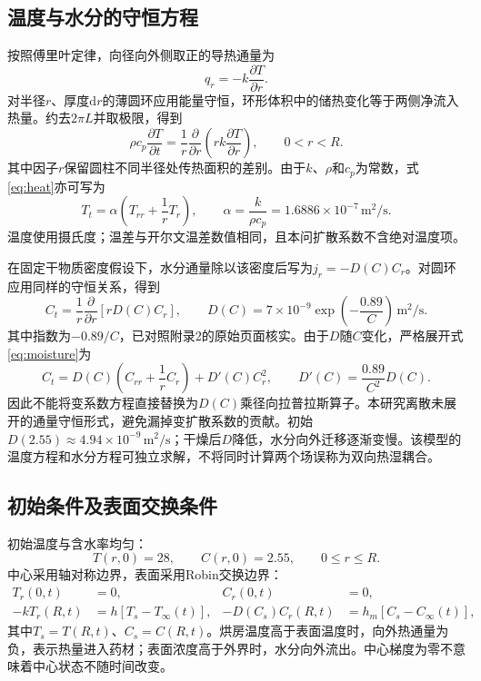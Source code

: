 \documentclass[UTF8,a4paper,11pt]{ctexart}
\begin{document}
\subsection{温度与水分的守恒方程}
按照傅里叶定律，向径向外侧取正的导热通量为
\begin{equation}
 q_r=-k\frac{\partial T}{\partial r}.
\end{equation}
对半径$r$、厚度$\mathrm dr$的薄圆环应用能量守恒，环形体积中的储热变化等于两侧净流入热量。约去$2\pi L$并取极限，得到
\begin{equation}\label{eq:heat}
 \rho c_p\frac{\partial T}{\partial t}
 =\frac1r\frac{\partial}{\partial r}\left(rk\frac{\partial T}{\partial r}\right),\qquad 0<r<R.
\end{equation}
其中因子$r$保留圆柱不同半径处传热面积的差别。由于$k$、$\rho$和$c_p$为常数，式\eqref{eq:heat}亦可写为
\begin{equation}
 T_t=\alpha\left(T_{rr}+\frac1rT_r\right),\qquad
 \alpha=\frac{k}{\rho c_p}=1.6886\times10^{-7}\,\mathrm{m^2/s}.
\end{equation}
温度使用摄氏度；温差与开尔文温差数值相同，且本问扩散系数不含绝对温度项。

在固定干物质密度假设下，水分通量除以该密度后写为$j_r=-D(C)C_r$。对圆环应用同样的守恒关系，得到
\begin{equation}\label{eq:moisture}
 C_t=\frac1r\frac{\partial}{\partial r}\left[rD(C)C_r\right],\qquad
 D(C)=7\times10^{-9}\exp\left(-\frac{0.89}{C}\right)\,\mathrm{m^2/s}.
\end{equation}
其中指数为$-0.89/C$，已对照附录2的原始页面核实。由于$D$随$C$变化，严格展开式\eqref{eq:moisture}为
\begin{equation}
 C_t=D(C)\left(C_{rr}+\frac1rC_r\right)+D'(C)C_r^2,\qquad
 D'(C)=\frac{0.89}{C^2}D(C).
\end{equation}
因此不能将变系数方程直接替换为$D(C)$乘径向拉普拉斯算子。本研究离散未展开的通量守恒形式，避免漏掉变扩散系数的贡献。初始$D(2.55)\approx4.94\times10^{-9}\,\mathrm{m^2/s}$；干燥后$D$降低，水分向外迁移逐渐变慢。该模型的温度方程和水分方程可独立求解，不将同时计算两个场误称为双向热湿耦合。

\subsection{初始条件及表面交换条件}
初始温度与含水率均匀：
\begin{equation}
 T(r,0)=28,\qquad C(r,0)=2.55,\qquad 0\le r\le R.
\end{equation}
中心采用轴对称边界，表面采用Robin交换边界：
\begin{align}
 T_r(0,t)&=0, & C_r(0,t)&=0,\\
 -kT_r(R,t)&=h[T_s-T_\infty(t)], &
 -D(C_s)C_r(R,t)&=h_m[C_s-C_\infty(t)],\label{eq:bc}
\end{align}
其中$T_s=T(R,t)$、$C_s=C(R,t)$。烘房温度高于表面温度时，向外热通量为负，表示热量进入药材；表面浓度高于外界时，水分向外流出。中心梯度为零不意味着中心状态不随时间改变。
\end{document}
